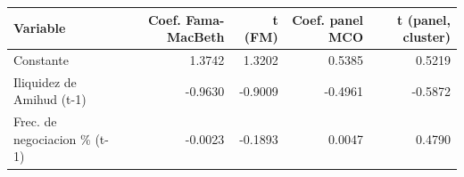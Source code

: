 \begin{tabular}{lrrrr}
\toprule
Variable & Coef. Fama-MacBeth & t (FM) & Coef. panel MCO & t (panel, cluster) \\
\midrule
Constante & 1.3742 & 1.3202 & 0.5385 & 0.5219 \\
Iliquidez de Amihud (t-1) & -0.9630 & -0.9009 & -0.4961 & -0.5872 \\
Frec. de negociacion \% (t-1) & -0.0023 & -0.1893 & 0.0047 & 0.4790 \\
\bottomrule
\end{tabular}